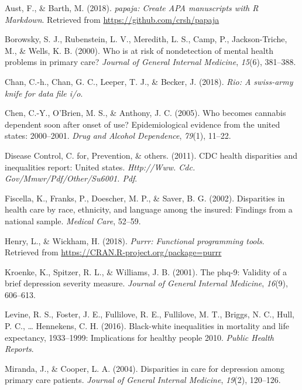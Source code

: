 \documentclass[man]{apa6}
\begin{document}
\hypertarget{ref-R-papaja}{}
Aust, F., \& Barth, M. (2018). \emph{papaja: Create APA manuscripts with
R Markdown}. Retrieved from \url{https://github.com/crsh/papaja}

\hypertarget{ref-borowsky2000risk}{}
Borowsky, S. J., Rubenstein, L. V., Meredith, L. S., Camp, P.,
Jackson-Triche, M., \& Wells, K. B. (2000). Who is at risk of
nondetection of mental health problems in primary care? \emph{Journal of
General Internal Medicine}, \emph{15}(6), 381--388.

\hypertarget{ref-R-rio}{}
Chan, C.-h., Chan, G. C., Leeper, T. J., \& Becker, J. (2018).
\emph{Rio: A swiss-army knife for data file i/o}.

\hypertarget{ref-chen2005becomes}{}
Chen, C.-Y., O'Brien, M. S., \& Anthony, J. C. (2005). Who becomes
cannabis dependent soon after onset of use? Epidemiological evidence
from the united states: 2000--2001. \emph{Drug and Alcohol Dependence},
\emph{79}(1), 11--22.

\hypertarget{ref-centers2011cdc}{}
Disease Control, C. for, Prevention, \& others. (2011). CDC health
disparities and inequalities report: United states. \emph{Http://Www.
Cdc. Gov/Mmwr/Pdf/Other/Su6001. Pdf}.

\hypertarget{ref-fiscella2002disparities}{}
Fiscella, K., Franks, P., Doescher, M. P., \& Saver, B. G. (2002).
Disparities in health care by race, ethnicity, and language among the
insured: Findings from a national sample. \emph{Medical Care}, 52--59.

\hypertarget{ref-R-purrr}{}
Henry, L., \& Wickham, H. (2018). \emph{Purrr: Functional programming
tools}. Retrieved from \url{https://CRAN.R-project.org/package=purrr}

\hypertarget{ref-kroenke2001phq}{}
Kroenke, K., Spitzer, R. L., \& Williams, J. B. (2001). The phq-9:
Validity of a brief depression severity measure. \emph{Journal of
General Internal Medicine}, \emph{16}(9), 606--613.

\hypertarget{ref-levine2016black}{}
Levine, R. S., Foster, J. E., Fullilove, R. E., Fullilove, M. T.,
Briggs, N. C., Hull, P. C., \ldots{} Hennekens, C. H. (2016).
Black-white inequalities in mortality and life expectancy, 1933--1999:
Implications for healthy people 2010. \emph{Public Health Reports}.

\hypertarget{ref-miranda2004disparities}{}
Miranda, J., \& Cooper, L. A. (2004). Disparities in care for depression
among primary care patients. \emph{Journal of General Internal
Medicine}, \emph{19}(2), 120--126.
\end{document}
